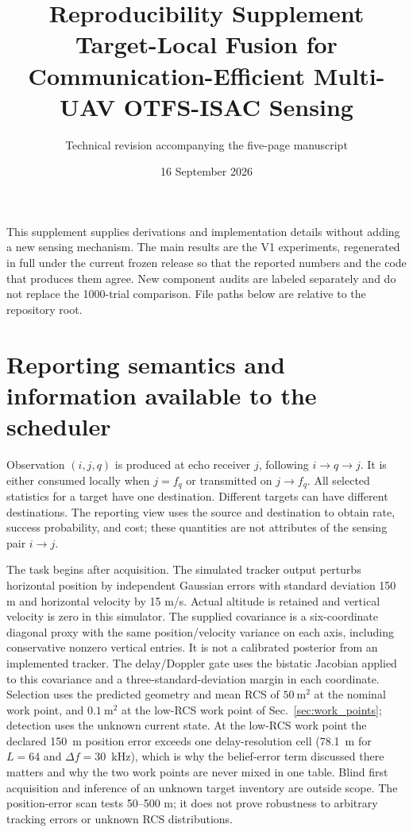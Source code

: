 \documentclass[10pt]{article}
\title{Reproducibility Supplement\\
\large Target-Local Fusion for Communication-Efficient Multi-UAV OTFS-ISAC Sensing}
\author{Technical revision accompanying the five-page manuscript}
\date{16 September 2026}
\begin{document}
\maketitle
\noindent This supplement supplies derivations and implementation details without
adding a new sensing mechanism. The main results are the V1 experiments,
regenerated in full under the current frozen release so that the reported
numbers and the code that produces them agree. New component audits are
labeled separately and do not replace the
1000-trial comparison. File paths below are relative to the repository root.

\section{Reporting semantics and information available to the scheduler}
Observation $(i,j,q)$ is produced at echo receiver $j$, following
$i\to q\to j$. It is either consumed locally when $j=f_q$ or transmitted on
$j\to f_q$. All selected statistics for a target have one destination.
Different targets can have different destinations. The reporting view uses
the source and destination to obtain rate, success probability, and cost;
these quantities are not attributes of the sensing pair $i\to j$.

The task begins after acquisition. The simulated tracker output perturbs
horizontal position by independent Gaussian errors with standard deviation
150 m and horizontal velocity by 15 m/s. Actual altitude is retained and
vertical velocity is zero in this simulator. The supplied covariance is a
six-coordinate diagonal proxy with the same position/velocity variance on
each axis, including conservative nonzero vertical entries. It is not a
calibrated posterior from an implemented tracker. The delay/Doppler gate uses
the bistatic Jacobian applied to this covariance and a three-standard-deviation
margin in each coordinate. Selection uses the predicted geometry and mean
RCS of $50~\mathrm{m}^2$ at the nominal work point, and $0.1~\mathrm{m}^2$ at
the low-RCS work point of Sec.~\ref{sec:work_points}; detection uses the unknown
current state. At the low-RCS work point the declared 150~m position error
exceeds one delay-resolution cell (78.1~m for $L=64$ and
$\Delta f=30$~kHz), which is why the belief-error term discussed there matters
and why the two work points are never mixed in one table. Blind first
acquisition and inference of an unknown target inventory are outside scope.
The position-error scan tests 50--500 m; it does not prove robustness to arbitrary
tracking errors or unknown RCS distributions.
\end{document}
